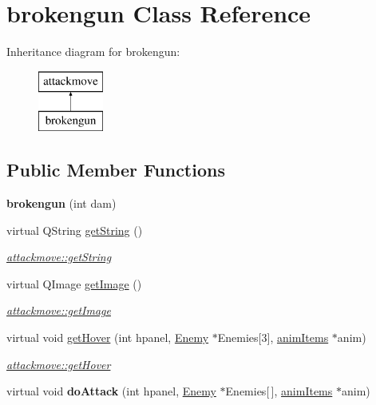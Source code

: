 \hypertarget{classbrokengun}{\section{brokengun Class Reference}
\label{classbrokengun}
}
Inheritance diagram for brokengun\-:\begin{figure}[H]
\begin{center}
\leavevmode
\includegraphics[height=2.000000cm]{classbrokengun}
\end{center}
\end{figure}
\subsection*{Public Member Functions}
\begin{DoxyCompactItemize}
\item 
\hypertarget{classbrokengun_a01e8a685a44e19355ef284c3f172532c}{{\bfseries brokengun} (int dam)}\label{classbrokengun_a01e8a685a44e19355ef284c3f172532c}

\item 
virtual Q\-String \hyperlink{classbrokengun_af525de1fc249ff4fadec008b367881e9}{get\-String} ()
\begin{DoxyCompactList}\small\item\em \hyperlink{classattackmove_ada49eedf4b893372c576edd48fe73161}{attackmove\-::get\-String} \end{DoxyCompactList}\item 
virtual Q\-Image \hyperlink{classbrokengun_aceb704b315cbac5e23093637a9b3c0c0}{get\-Image} ()
\begin{DoxyCompactList}\small\item\em \hyperlink{classattackmove_aca59a2343b7a6c195d300dda5c8d952d}{attackmove\-::get\-Image} \end{DoxyCompactList}\item 
virtual void \hyperlink{classbrokengun_ab2250f29c2057006662e77d7f70796d2}{get\-Hover} (int hpanel, \hyperlink{class_enemy}{Enemy} $\ast$Enemies\mbox{[}3\mbox{]}, \hyperlink{classanim_items}{anim\-Items} $\ast$anim)
\begin{DoxyCompactList}\small\item\em \hyperlink{classattackmove_a0ff82349551bd72f4d57b3367bb318fa}{attackmove\-::get\-Hover} \end{DoxyCompactList}\item 
\hypertarget{classbrokengun_a36f299faa4df56576af55adbff08a9be}{virtual void {\bfseries do\-Attack} (int hpanel, \hyperlink{class_enemy}{Enemy} $\ast$Enemies\mbox{[}$\,$\mbox{]}, \hyperlink{classanim_items}{anim\-Items} $\ast$anim)}\label{classbrokengun_a36f299faa4df56576af55adbff08a9be}

\end{DoxyCompactItemize}
